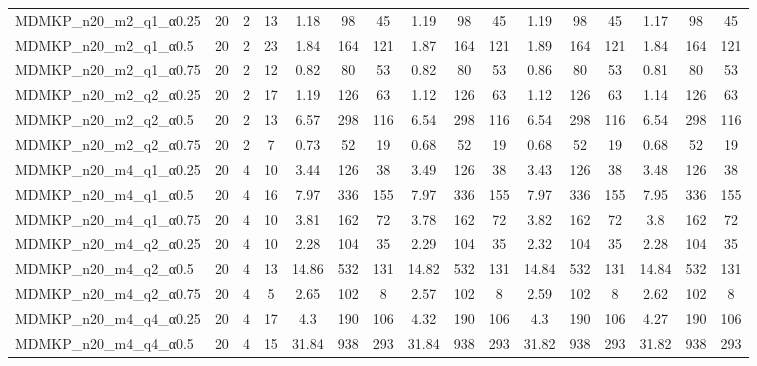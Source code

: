 \begin{sidewaystable}[!ht]
{\begin{tabular}{lccccccccccccccc}
MDMKP\_n20\_m2\_q1\_α0.25 & 20 & 2 & 13 & 1.18 & 98 & 45 & 1.19 & 98 & 45 & 1.19 & 98 & 45 &  \textcolor{blue2}{1.17} & 98 & 45 \\
MDMKP\_n20\_m2\_q1\_α0.5 & 20 & 2 & 23 &  \textcolor{blue2}{1.84} & 164 & 121 & 1.87 & 164 & 121 & 1.89 & 164 & 121 &  \textcolor{blue2}{1.84} & 164 & 121 \\
MDMKP\_n20\_m2\_q1\_α0.75 & 20 & 2 & 12 & 0.82 & 80 & 53 & 0.82 & 80 & 53 & 0.86 & 80 & 53 &  \textcolor{blue2}{0.81} & 80 & 53 \\
MDMKP\_n20\_m2\_q2\_α0.25 & 20 & 2 & 17 & 1.19 & 126 & 63 &  \textcolor{blue2}{1.12} & 126 & 63 &  \textcolor{blue2}{1.12} & 126 & 63 & 1.14 & 126 & 63 \\
MDMKP\_n20\_m2\_q2\_α0.5 & 20 & 2 & 13 & 6.57 & 298 & 116 &  \textcolor{blue2}{6.54} & 298 & 116 &  \textcolor{blue2}{6.54} & 298 & 116 &  \textcolor{blue2}{6.54} & 298 & 116 \\
MDMKP\_n20\_m2\_q2\_α0.75 & 20 & 2 & 7 & 0.73 & 52 & 19 &  \textcolor{blue2}{0.68} & 52 & 19 &  \textcolor{blue2}{0.68} & 52 & 19 &  \textcolor{blue2}{0.68} & 52 & 19 \\
MDMKP\_n20\_m4\_q1\_α0.25 & 20 & 4 & 10 & 3.44 & 126 & 38 & 3.49 & 126 & 38 &  \textcolor{blue2}{3.43} & 126 & 38 & 3.48 & 126 & 38 \\
MDMKP\_n20\_m4\_q1\_α0.5 & 20 & 4 & 16 & 7.97 & 336 & 155 & 7.97 & 336 & 155 & 7.97 & 336 & 155 &  \textcolor{blue2}{7.95} & 336 & 155 \\
MDMKP\_n20\_m4\_q1\_α0.75 & 20 & 4 & 10 & 3.81 & 162 & 72 &  \textcolor{blue2}{3.78} & 162 & 72 & 3.82 & 162 & 72 & 3.8 & 162 & 72 \\
MDMKP\_n20\_m4\_q2\_α0.25 & 20 & 4 & 10 &  \textcolor{blue2}{2.28} & 104 & 35 & 2.29 & 104 & 35 & 2.32 & 104 & 35 &  \textcolor{blue2}{2.28} & 104 & 35 \\
MDMKP\_n20\_m4\_q2\_α0.5 & 20 & 4 & 13 & 14.86 & 532 & 131 &  \textcolor{blue2}{14.82} & 532 & 131 & 14.84 & 532 & 131 & 14.84 & 532 & 131 \\
MDMKP\_n20\_m4\_q2\_α0.75 & 20 & 4 & 5 & 2.65 & 102 & 8 &  \textcolor{blue2}{2.57} & 102 & 8 & 2.59 & 102 & 8 & 2.62 & 102 & 8 \\
MDMKP\_n20\_m4\_q4\_α0.25 & 20 & 4 & 17 & 4.3 & 190 & 106 & 4.32 & 190 & 106 & 4.3 & 190 & 106 &  \textcolor{blue2}{4.27} & 190 & 106 \\
MDMKP\_n20\_m4\_q4\_α0.5 & 20 & 4 & 15 & 31.84 & 938 & 293 & 31.84 & 938 & 293 &  \textcolor{blue2}{31.82} & 938 & 293 &  \textcolor{blue2}{31.82} & 938 & 293 \\

\end{tabular}}
\end{sidewaystable}
